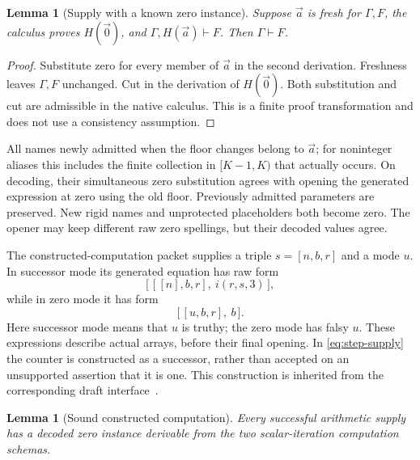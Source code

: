 \documentclass[11pt,letterpaper]{article}
\newtheorem{lemma}[theorem]{Lemma}
\theoremstyle{definition}\newtheorem{definition}[theorem]{Definition}
\theoremstyle{remark}\newtheorem{remark}[theorem]{Remark}
\begin{document}
\begin{lemma}[Supply with a known zero instance]
\label{lem:zero-supply}
Suppose $\vec a$ is fresh for $\Gamma,F$, the calculus proves
$H(\vec0)$, and $\Gamma,H(\vec a)\vdash F$.  Then
$\Gamma\vdash F$.
\end{lemma}

\begin{proof}
Substitute zero for every member of $\vec a$ in the second derivation.
Freshness leaves $\Gamma,F$ unchanged.  Cut in the derivation of
$H(\vec0)$.  Both substitution and cut are admissible in the native
calculus.  This is a finite proof transformation and does not use a
consistency assumption.
\end{proof}

All names newly admitted when the floor changes belong to $\vec a$;
for noninteger aliases this includes the finite collection in
$[K-1,K)$ that actually occurs.  On decoding, their simultaneous zero
substitution agrees with opening the generated expression at zero using
the old floor.  Previously admitted parameters are preserved.  New
rigid names and unprotected placeholders both become zero.  The opener
may keep different raw zero spellings, but their decoded values agree.

The constructed-computation packet supplies a triple $s=[n,b,r]$ and a
mode $u$.  In successor mode its generated equation has raw form
\[
 \bigl[\,[[n],b,r],\ i(r,s,3)\,\bigr],
 \tag{Step supply}\label{eq:step-supply}
\]
while in zero mode it has form
\[
                    \bigl[\,[u,b,r],\ b\,\bigr].
 \tag{Zero supply}\label{eq:base-supply}
\]
Here successor mode means that $u$ is truthy; the zero mode has falsy
$u$.  These expressions describe actual arrays, before their final
opening.  In \eqref{eq:step-supply} the counter is constructed as a
successor, rather than accepted on an unsupported assertion that it is
one.  This construction is inherited from the corresponding draft
interface~\cite{constructed}.

\begin{lemma}[Sound constructed computation]
\label{lem:constructed-supply}
Every successful arithmetic supply has a decoded zero instance
derivable from the two scalar-iteration computation schemas.
\end{lemma}
\end{document}
